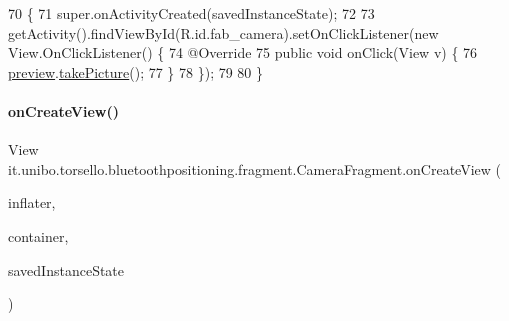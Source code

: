 \begin{DoxyCode}
70                                                                        \{
71         super.onActivityCreated(savedInstanceState);
72 
73         getActivity().findViewById(R.id.fab\_camera).setOnClickListener(\textcolor{keyword}{new} View.OnClickListener() \{
74             @Override
75             \textcolor{keyword}{public} \textcolor{keywordtype}{void} onClick(View v) \{
76                 \hyperlink{classit_1_1unibo_1_1torsello_1_1bluetoothpositioning_1_1fragment_1_1CameraFragment_af14f8f1e4107c9a9063cf70d1fbb5bb5_af14f8f1e4107c9a9063cf70d1fbb5bb5}{preview}.\hyperlink{classit_1_1unibo_1_1torsello_1_1bluetoothpositioning_1_1util_1_1CameraPreviewUtil_a4f4ca8b7292c4e410f1f5aca3a53423a_a4f4ca8b7292c4e410f1f5aca3a53423a}{takePicture}();
77             \}
78         \});
79 
80     \}
\end{DoxyCode}
\hypertarget{classit_1_1unibo_1_1torsello_1_1bluetoothpositioning_1_1fragment_1_1CameraFragment_a3a80f360922bd6a8c749cda2a09c64cf_a3a80f360922bd6a8c749cda2a09c64cf}{}\label{classit_1_1unibo_1_1torsello_1_1bluetoothpositioning_1_1fragment_1_1CameraFragment_a3a80f360922bd6a8c749cda2a09c64cf_a3a80f360922bd6a8c749cda2a09c64cf} 
\paragraph{\texorpdfstring{on\+Create\+View()}{onCreateView()}}
{\footnotesize\ttfamily View it.\+unibo.\+torsello.\+bluetoothpositioning.\+fragment.\+Camera\+Fragment.\+on\+Create\+View (\begin{DoxyParamCaption}\item[{Layout\+Inflater}]{inflater,  }\item[{View\+Group}]{container,  }\item[{Bundle}]{saved\+Instance\+State }\end{DoxyParamCaption})}



